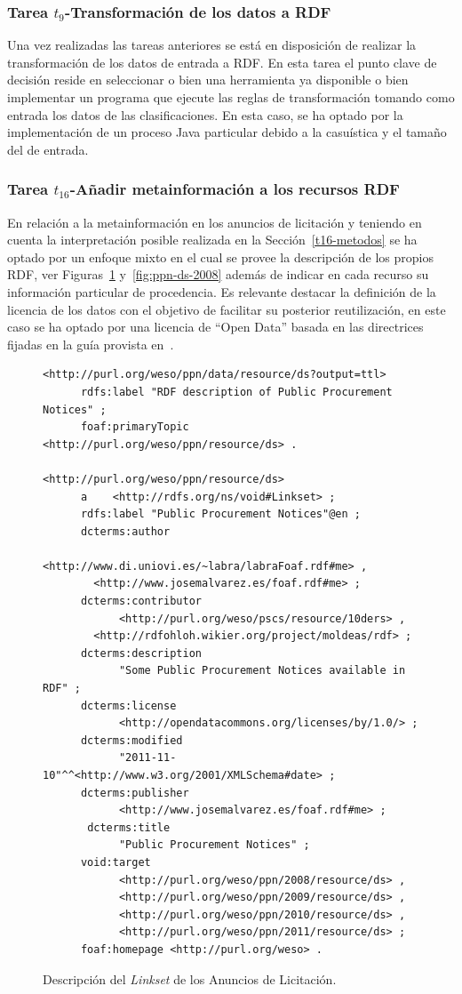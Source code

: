 \subsubsection{Tarea $t_9$-Transformación de los datos a RDF }
Una vez realizadas las tareas anteriores se está en disposición de realizar la transformación 
de los datos de entrada a \gls{RDF}. En esta tarea el punto clave de decisión reside en seleccionar o bien 
una herramienta ya disponible o bien implementar un programa que ejecute las reglas de transformación 
tomando como entrada los datos de las clasificaciones. En esta caso, se ha optado por la implementación 
de un proceso Java particular debido a la casuística y el tamaño del \dataset de entrada.
% 
\subsubsection{Tarea $t_{16}$-Añadir metainformación a los recursos RDF}\label{t16-ppn}
En relación a la metainformación en los anuncios de licitación y teniendo en cuenta 
la interpretación posible realizada en la Sección~\ref{t16-metodos} se ha optado 
por un enfoque mixto en el cual se provee la descripción de los propios 
\datasets \gls{RDF}, ver Figuras~\ref{fig:ppn-ls} y~\ref{fig:ppn-ds-2008} además de indicar en 
cada recurso su información particular de procedencia. Es relevante destacar 
la definición de la licencia de los datos con el objetivo de facilitar 
su posterior reutilización, en este caso se ha optado por una licencia de ``Open Data'' basada en las 
directrices fijadas en la guía provista en~\cite{od-license}.
% 
\begin{figure}[!htp]
\begin{lstlisting} 
<http://purl.org/weso/ppn/data/resource/ds?output=ttl>
      rdfs:label "RDF description of Public Procurement Notices" ;
      foaf:primaryTopic <http://purl.org/weso/ppn/resource/ds> .

<http://purl.org/weso/ppn/resource/ds>
      a    <http://rdfs.org/ns/void#Linkset> ;
      rdfs:label "Public Procurement Notices"@en ;
      dcterms:author 
            <http://www.di.uniovi.es/~labra/labraFoaf.rdf#me> , 
	    <http://www.josemalvarez.es/foaf.rdf#me> ;
      dcterms:contributor
            <http://purl.org/weso/pscs/resource/10ders> ,
	    <http://rdfohloh.wikier.org/project/moldeas/rdf> ;
      dcterms:description 
            "Some Public Procurement Notices available in RDF" ;
      dcterms:license
            <http://opendatacommons.org/licenses/by/1.0/> ;
      dcterms:modified
            "2011-11-10"^^<http://www.w3.org/2001/XMLSchema#date> ;
      dcterms:publisher
            <http://www.josemalvarez.es/foaf.rdf#me> ;
       dcterms:title
            "Public Procurement Notices" ;
      void:target
            <http://purl.org/weso/ppn/2008/resource/ds> , 
            <http://purl.org/weso/ppn/2009/resource/ds> , 
            <http://purl.org/weso/ppn/2010/resource/ds> , 
            <http://purl.org/weso/ppn/2011/resource/ds> ;
      foaf:homepage <http://purl.org/weso> .	
\end{lstlisting}
	\caption{Descripción del \textit{Linkset} de los Anuncios de Licitación.}
	\label{fig:ppn-ls}
\end{figure}


